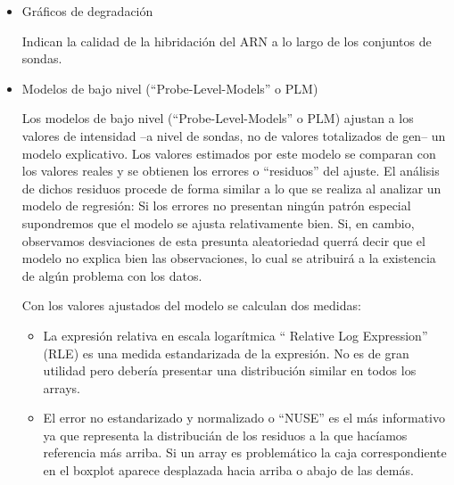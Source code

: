 \begin{itemize}
Muestran la estimaci\'on de la densidad (a partir del  histograma) de los datos.
Por lo general, las distribuciones de los arrays deber\'ian tener formas y rangos similares. Los arrays cuyas distribuciones son muy
diferentes al resto deben ser considerados como arrays con posibles problemas.


 \item Gr\'aficos de degradaci\'on

Indican la calidad de la hibridaci\'on del ARN a lo largo de los conjuntos de sondas.


\vspace{-0.5cm}
\begin{figure}[!h]
\label{c05DenDigPlot}
\end{figure}


    \item Modelos de bajo nivel (``Probe-Level-Models'' o PLM)


Los modelos de bajo nivel (``Probe-Level-Models'' o PLM) ajustan a los valores de intensidad --a nivel de sondas, no de valores totalizados de gen-- un modelo explicativo. Los valores estimados por este modelo se comparan con los valores reales y se obtienen los errores o ``residuos'' del ajuste. El an\'alisis de dichos residuos procede de forma similar a lo que se realiza al analizar un modelo de regresi\'on:
Si los errores no presentan ning\'un patr\'on especial supondremos que el modelo se ajusta relativamente bien.
Si, en cambio, observamos desviaciones de esta presunta aleatoriedad querr\'a decir que el modelo no explica bien las observaciones, lo cual se atribuir\'a a la existencia de alg\'un problema con los datos.

Con los valores ajustados del modelo se calculan dos medidas:

\begin{itemize}
\item La expresi\'on relativa en escala logar\'itmica `` Relative Log Expression'' (RLE) es una medida estandarizada de la expresi\'on.
No es de gran utilidad pero deber\'ia presentar una distribuci\'on similar en todos los arrays.
\item El error no estandarizado y normalizado o ``NUSE'' es el m\'as informativo ya que representa la distribuci\'an de los residuos a la que
hac\'iamos referencia m\'as arriba.
Si un array es problem\'atico la caja correspondiente en el boxplot aparece desplazada hacia arriba o abajo de las dem\'as.
\end{itemize}

\end{itemize}



